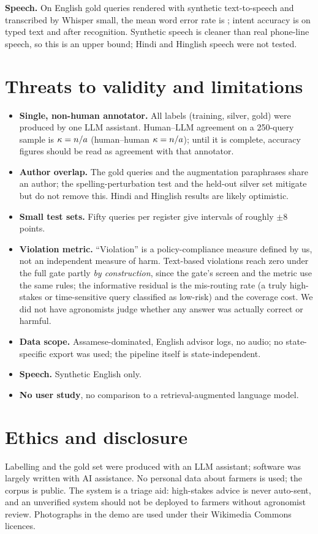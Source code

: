 \documentclass[11pt]{article}
\begin{document}
\textbf{Speech.} On \voiceN{} English gold queries rendered with synthetic text-to-speech and transcribed by Whisper small, the mean word error rate is \werMean{}; intent accuracy is \voiceTextAcc{} on typed text and \voiceAsrAcc{} after recognition. Synthetic speech is cleaner than real phone-line speech, so this is an upper bound; Hindi and Hinglish speech were not tested.

\section{Threats to validity and limitations}
\label{sec:threats}
\begin{itemize}
\item \textbf{Single, non-human annotator.} All labels (training, silver, gold) were produced by one LLM assistant. Human--LLM agreement on a 250-query sample is $\kappa=n/a{}$ (human--human $\kappa=n/a{}$); until it is complete, accuracy figures should be read as agreement with that annotator.
\item \textbf{Author overlap.} The gold queries and the augmentation paraphrases share an author; the spelling-perturbation test and the held-out silver set mitigate but do not remove this. Hindi and Hinglish results are likely optimistic.
\item \textbf{Small test sets.} Fifty queries per register give intervals of roughly $\pm 8$ points.
\item \textbf{Violation metric.} ``Violation'' is a policy-compliance measure defined by us, not an independent measure of harm. Text-based violations reach zero under the full gate partly \emph{by construction}, since the gate's screen and the metric use the same rules; the informative residual is the mis-routing rate (a truly high-stakes or time-sensitive query classified as low-risk) and the coverage cost. We did not have agronomists judge whether any answer was actually correct or harmful.
\item \textbf{Data scope.} Assamese-dominated, English advisor logs, no audio; no state-specific export was used; the pipeline itself is state-independent.
\item \textbf{Speech.} Synthetic English only.
\item \textbf{No user study}, no comparison to a retrieval-augmented language model.
\end{itemize}

\section{Ethics and disclosure}
Labelling and the gold set were produced with an LLM assistant; software was largely written with AI assistance. No personal data about farmers is used; the corpus is public. The system is a triage aid: high-stakes advice is never auto-sent, and an unverified system should not be deployed to farmers without agronomist review. Photographs in the demo are used under their Wikimedia Commons licences.
\end{document}
